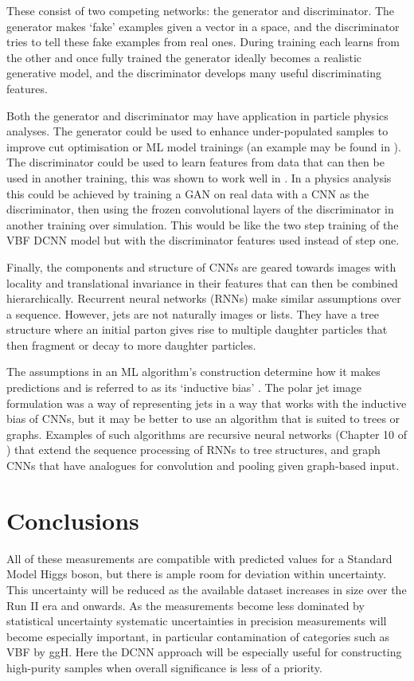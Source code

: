 These consist of two competing networks: the generator and discriminator. 
The generator makes `fake' examples given a vector in a space, and the discriminator tries to tell these fake examples from real ones. 
During training each learns from the other and once fully trained the generator ideally becomes a realistic generative model, and the discriminator develops many useful discriminating features.

Both the generator and discriminator may have application in particle physics analyses. The generator could be used to enhance under-populated samples to improve cut optimisation or ML model trainings (an example may be found in \cite{GANChest}).
The discriminator could be used to learn features from data that can then be used in another training, this was shown to work well in \cite{DCGAN}. 
In a physics analysis this could be achieved by training a GAN on real data with a CNN as the discriminator, then using the frozen convolutional layers of the discriminator in another training over simulation. 
This would be like the two step training of the VBF DCNN model but with the discriminator features used instead of step one.


Finally, the components and structure of CNNs are geared towards images with locality and translational invariance in their features that can then be combined hierarchically. 
Recurrent neural networks (RNNs) make similar assumptions over a sequence. 
However, jets are not naturally images or lists. They have a tree structure where an initial parton gives rise to multiple daughter particles that then fragment or decay to more daughter particles.

The assumptions in an ML algorithm's construction determine how it makes predictions and is referred to as its `inductive bias' \cite{InductiveBias}.
The polar jet image formulation was a way of representing jets in a way that works with the inductive bias of CNNs, but it may be better to use an algorithm that is suited to trees or graphs.
Examples of such algorithms are recursive neural networks (Chapter 10 of \cite{DeepLearningBook}) that extend the sequence processing of RNNs to tree structures, and graph CNNs \cite{GraphCNNs} that have analogues for convolution and pooling given graph-based input.


\section{Conclusions}
All of these measurements are compatible with predicted values for a Standard Model Higgs boson, but there is ample room for deviation within uncertainty.
This uncertainty will be reduced as the available dataset increases in size over the Run II era and onwards. 
As the measurements become less dominated by statistical uncertainty systematic uncertainties in precision measurements will become especially important, in particular contamination of categories such as VBF by ggH. 
Here the DCNN approach will be especially useful for constructing high-purity samples when overall significance is less of a priority.


